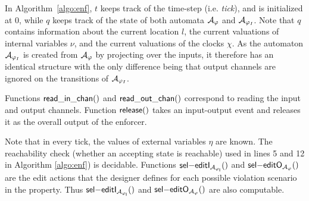 In Algorithm~\ref{algo:enf}, $t$ keeps track of the time-step (i.e. \emph{tick}), and is initialized at 0, while $q$ keeps track of the state of both automata ${\mathcal A}_{\varphi}$ and ${\mathcal A}_{\varphi_I}$.
Note that $q$ contains information about the current location $l$, the current valuations of internal variables $\nu$, and the current valuations of the clocks $\chi$.
As the automaton ${\mathcal A}_{\varphi_I}$ is created from ${\mathcal A}_{\varphi}$ by projecting over the inputs, it therefore has an identical structure with the only difference being that output channels are ignored on the transitions of ${\mathcal A}_{\varphi_I}$.

Functions $\mathsf{read\_in\_chan}()$ and $\mathsf{read\_out\_chan}()$ correspond to reading the input and output channels.
Function $\mathsf{release}()$ takes an input-output event and releases it as the overall output of the enforcer.

\begin{remark}
	Note that in every tick, the values of external variables $\eta$ are known. 
	The reachability check (whether an accepting state is reachable) used in lines 5 and 12 in Algorithm \ref{algo:enf}) is decidable.   
	Functions $\mathsf{{sel}\relax{-} editI_{{\mathcal A}_{\varphi_{I}}}}()$ and $\mathsf{{sel}\relax{-} editO_{{\mathcal A}_\varphi}}()$ are the edit actions that the designer defines for each possible violation scenario in the property. Thus $\mathsf{{sel}\relax{-} editI_{{\mathcal A}_{\varphi_{I}}}}()$ and $\mathsf{{sel}\relax{-} editO_{{\mathcal A}_\varphi}}()$ are also computable.   
\end{remark}


